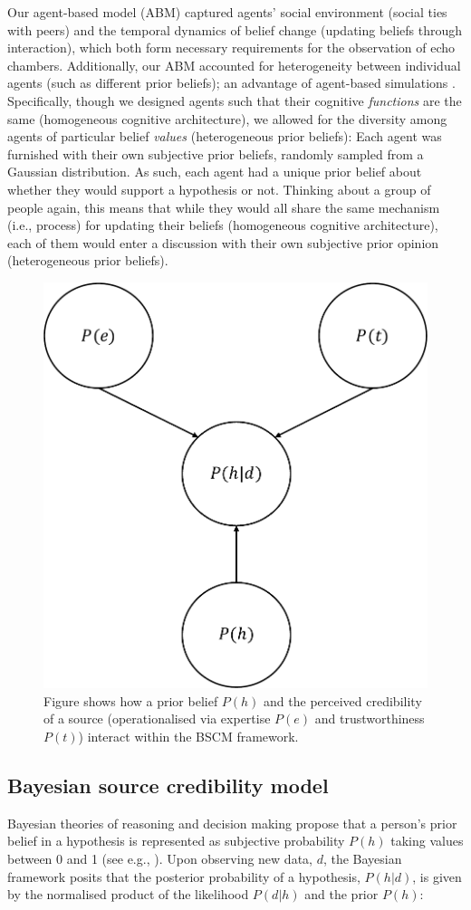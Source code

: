 \documentclass[fleqn,10pt]{wlscirep}
\begin{document}
Our agent-based model (ABM) captured agents' social environment (social ties with peers) and the temporal dynamics of belief change (updating beliefs through interaction), which both form necessary requirements for the observation of echo chambers. Additionally, our ABM accounted for heterogeneity between individual agents (such as different prior beliefs); an advantage of agent-based simulations \cite{wilensky2015introduction}. Specifically, though we designed agents such that their cognitive \textit{functions} are the same (homogeneous cognitive architecture), we allowed for the diversity among agents of particular belief \textit{values} (heterogeneous prior beliefs): Each agent was furnished with their own subjective prior beliefs, randomly sampled from a Gaussian distribution. As such, each agent had a unique prior belief about whether they would support a hypothesis or not. Thinking about a group of people again, this means that while they would all share the same mechanism (i.e., process) for updating their beliefs (homogeneous cognitive architecture), each of them would enter a discussion with their own subjective prior opinion (heterogeneous prior beliefs).

\begin{figure}[ht]
\centering
\includegraphics[width=0.35\columnwidth]{figure1.pdf}
\caption{Figure shows how a prior belief \(P(h)\) and the perceived credibility of a source (operationalised via expertise \(P(e)\) and trustworthiness \(P(t)\)) interact within the BSCM framework.}
\label{fig:bscm}
\end{figure}

\subsection*{Bayesian source credibility model}
Bayesian theories of reasoning and decision making propose that a person's prior belief in a hypothesis is represented as subjective probability \(P(h)\) taking values between 0 and 1 (see e.g., \cite{hahn2007rationality, oaksford2007bayesian}). Upon observing new data, \(d\), the Bayesian framework posits that the posterior probability of a hypothesis, \(P(h|d)\), is given by the normalised product of the likelihood \(P(d|h)\) and the prior \(P(h)\):
\end{document}
